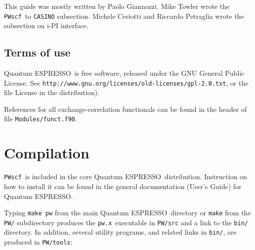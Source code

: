 \documentclass[12pt,a4paper]{article}
\def\PWscf{\texttt{PWscf}}
\def\qe{{\sc Quantum ESPRESSO}}
\def\pwx{\texttt{pw.x}}
\begin{document}

This guide was mostly written by Paolo Giannozzi.
Mike Towler wrote the \PWscf\ to \texttt{CASINO} subsection.
Michele Ceriotti and Riccardo Petraglia wrote the subsection on i-PI
interface.

 \subsection{Terms of use}

\qe\ is free software, released under the 
GNU General Public License. See
\texttt{http://www.gnu.org/licenses/old-licenses/gpl-2.0.txt}, 
or the file License in the distribution).
    


References for all exchange-correlation functionals can be found in the header
of file \texttt{Modules/funct.f90}.

\section{Compilation}

\PWscf\ is included in the core \qe\ distribution.
Instruction on how to install it can be found in the
general documentation (User's Guide) for \qe.

Typing \texttt{make pw} from the main \qe\ directory or
\texttt{make} from the \texttt{PW/} subdirectory produces
the \pwx\ executable in \texttt{PW/src} and a link to the
\texttt{bin/} directory. In addition, several utility
programs, and related links in \texttt{bin/}, are produced 
in \texttt{PW/tools}:
\end{document}
